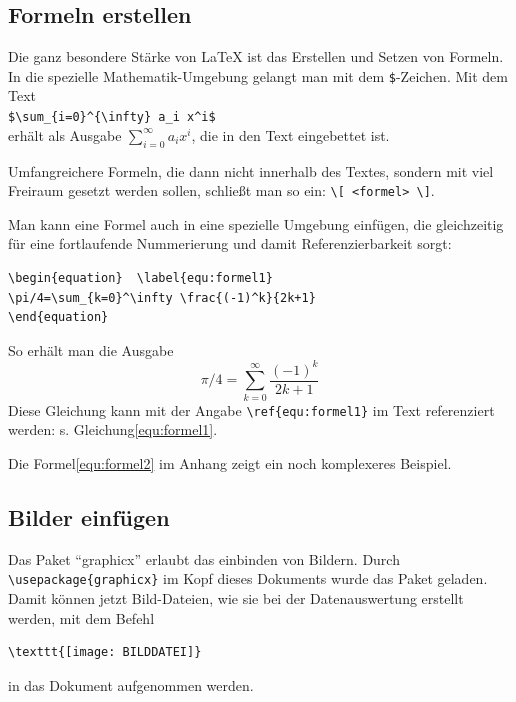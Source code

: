\documentclass[a4paper,10pt]{article}
\begin{document}
\subsection{Formeln erstellen}
Die ganz besondere Stärke von \LaTeX{} ist das Erstellen und
Setzen von Formeln. In die spezielle Mathematik-Umgebung 
gelangt man mit dem \verb|$|-Zeichen. Mit dem Text \\[0.5pc]
\verb|$\sum_{i=0}^{\infty} a_i x^i$|\\[0.5pc]
erhält als Ausgabe $\sum_{i=0}^{\infty} a_i x^i$, die in den
Text eingebettet ist. 

Umfangreichere Formeln, die dann nicht innerhalb des Textes, 
sondern mit viel Freiraum gesetzt werden sollen, 
schließt man  so ein: \verb|\[ <formel> \]|.

Man kann eine Formel auch in eine spezielle Umgebung einfügen,
die gleichzeitig für eine fortlaufende Nummerierung und damit 
Referenzierbarkeit sorgt:  
\begin{verbatim}
\begin{equation}  \label{equ:formel1}
\pi/4=\sum_{k=0}^\infty \frac{(-1)^k}{2k+1}
\end{equation} 
\end{verbatim}
So erhält man die Ausgabe
\begin{equation} \label{equ:formel1}
\pi/4=\sum_{k=0}^\infty \frac{(-1)^k}{2k+1}
\end{equation}
Diese Gleichung kann mit der Angabe \verb|\ref{equ:formel1}| im
Text referenziert werden:  s. Gleichung\ref{equ:formel1}.

Die Formel\ref{equ:formel2} im Anhang zeigt ein noch komplexeres
Beispiel.


\subsection{Bilder einfügen}
Das Paket "`graphicx"' erlaubt das einbinden von Bildern. Durch 
\verb!\usepackage{graphicx}! im Kopf dieses Dokuments wurde das Paket 
geladen. Damit können jetzt Bild-Dateien, wie sie bei der Datenauswertung
erstellt werden, mit dem Befehl
\begin{verbatim}
\texttt{[image: BILDDATEI]}
\end{verbatim}
in das Dokument aufgenommen werden.
\end{document}
